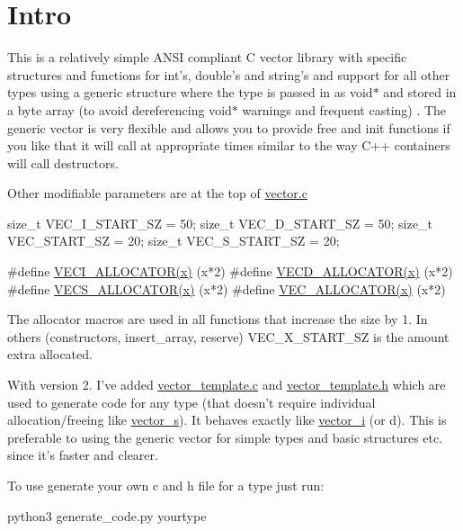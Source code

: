 \hypertarget{index_Intro}{}\section{\-Intro}\label{index_Intro}
\-This is a relatively simple \-A\-N\-S\-I compliant \-C vector library with specific structures and functions for int's, double's and string's and support for all other types using a generic structure where the type is passed in as void$\ast$ and stored in a byte array (to avoid dereferencing void$\ast$ warnings and frequent casting) . \-The generic vector is very flexible and allows you to provide free and init functions if you like that it will call at appropriate times similar to the way \-C++ containers will call destructors.

\-Other modifiable parameters are at the top of \hyperlink{vector_8c}{vector.\-c} 
\begin{DoxyPre}
size\_t VEC\_I\_START\_SZ = 50;
size\_t VEC\_D\_START\_SZ = 50;
size\_t VEC\_START\_SZ = 20;
size\_t VEC\_S\_START\_SZ = 20;\end{DoxyPre}



\begin{DoxyPre}#define \hyperlink{vector_8c_a88db9d722845b6a23eb29d044a0a3c98}{VECI\_ALLOCATOR(x)} (x*2)
#define \hyperlink{vector_8c_af2c425102d9020ae35b894de0c7eadea}{VECD\_ALLOCATOR(x)} (x*2)
#define \hyperlink{vector_8c_ac87bafa72aa9c4a4b255163bede52add}{VECS\_ALLOCATOR(x)} (x*2)
#define \hyperlink{vector_8c_acc6ff7ec59b6544f657758f724fb7a8b}{VEC\_ALLOCATOR(x)} (x*2)
\end{DoxyPre}
 \-The allocator macros are used in all functions that increase the size by 1. \-In others (constructors, insert\-\_\-array, reserve) \-V\-E\-C\-\_\-\-X\-\_\-\-S\-T\-A\-R\-T\-\_\-\-S\-Z is the amount extra allocated.

\-With version 2. \-I've added \hyperlink{vector__template_8c}{vector\-\_\-template.\-c} and \hyperlink{vector__template_8h}{vector\-\_\-template.\-h} which are used to generate code for any type (that doesn't require individual allocation/freeing like \hyperlink{structvector__s}{vector\-\_\-s}). \-It behaves exactly like \hyperlink{structvector__i}{vector\-\_\-i} (or d). \-This is preferable to using the generic vector for simple types and basic structures etc. since it's faster and clearer.

\-To use generate your own c and h file for a type just run\-: 
\begin{DoxyPre}
python3 generate\_code.py yourtype
\end{DoxyPre}


